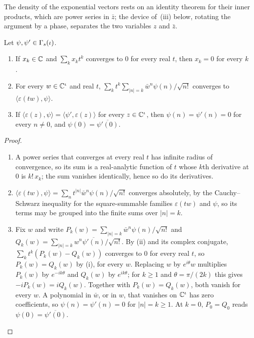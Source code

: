 \begin{veteenv}
The density of the exponential vectors rests on an identity theorem for their inner products, which are power series
in $\bar z$; the device of~(iii) below, rotating the argument by a phase, separates the two variables $z$ and $\bar z$.

\begin{lemma}\label{lem:dsq-identity}
Let $\psi,\psi'\in\Gamma_s(\iota)$.
\begin{enumerate}
\item[(i)] If $x_k\in\mathbb C$ and $\sum_kx_kt^k$ converges to $0$ for every real $t$, then $x_k=0$ for every $k$.
\item[(ii)] For every $w\in\mathbb C^\iota$ and real $t$, $\sum_kt^k\sum_{\lvert n\rvert=k}\bar w^n\psi(n)/\sqrt{n!}$ converges to
$\langle\varepsilon(tw),\psi\rangle$.
\item[(iii)] If $\langle\varepsilon(z),\psi\rangle=\langle\psi',\varepsilon(z)\rangle$ for every $z\in\mathbb C^\iota$, then
$\psi(n)=\psi'(n)=0$ for every $n\ne0$, and $\psi(0)=\overline{\psi'(0)}$.
\end{enumerate}
\end{lemma}

\begin{proof}
\begin{enumerate}
\item[(i)] A power series that converges at every real $t$ has infinite radius of convergence, so its sum is a real-analytic
function of $t$ whose $k$th derivative at $0$ is $k!\,x_k$; the sum vanishes identically, hence so do its derivatives.
\item[(ii)] $\langle\varepsilon(tw),\psi\rangle=\sum_nt^{\lvert n\rvert}\bar w^n\psi(n)/\sqrt{n!}$ converges absolutely, by the
Cauchy--Schwarz inequality for the square-summable families $\varepsilon(tw)$ and $\psi$, so its terms may be grouped into the
finite sums over $\lvert n\rvert=k$.
\item[(iii)] Fix $w$ and write $P_k(w)=\sum_{\lvert n\rvert=k}\bar w^n\psi(n)/\sqrt{n!}$ and
$Q_k(w)=\sum_{\lvert n\rvert=k}w^n\overline{\psi'(n)}/\sqrt{n!}$. By (ii) and its complex conjugate,
$\sum_kt^k(P_k(w)-Q_k(w))$ converges to $0$ for every real $t$, so $P_k(w)=Q_k(w)$ by (i), for every $w$. Replacing $w$ by
$e^{i\theta}w$ multiplies $P_k(w)$ by $e^{-ik\theta}$ and $Q_k(w)$ by $e^{ik\theta}$; for $k\ge1$ and $\theta=\pi/(2k)$
this gives $-iP_k(w)=iQ_k(w)$. Together with $P_k(w)=Q_k(w)$, both vanish for every $w$. A polynomial in $\bar w$, or in
$w$, that vanishes on $\mathbb C^\iota$ has zero coefficients, so $\psi(n)=\psi'(n)=0$ for $\lvert n\rvert=k\ge1$. At $k=0$,
$P_0=Q_0$ reads $\psi(0)=\overline{\psi'(0)}$.\qedhere
\end{enumerate}
\end{proof}


\end{veteenv}
